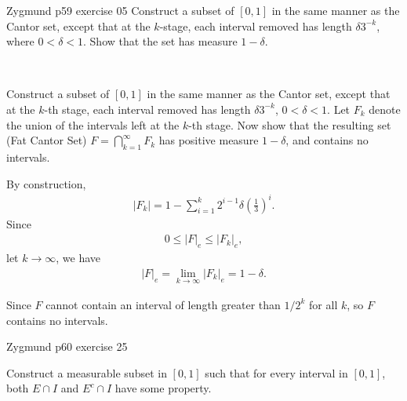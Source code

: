 \documentclass[UTF8,a4paper,10pt]{article}
\begin{document}
  \begin{Problem}[]{Zygmund p59 exercise 05}
    Construct a subset of $[0, 1]$ in the same manner as the Cantor set, except that at the $k$-stage, each interval removed has length $\delta3^{-k}$, where $0 < \delta < 1$. Show that the set has measure $1 - \delta$.


 
  \end{Problem}

  
\begin{solution}\,

  Construct a subset of \([0, 1]\) in the same manner as the Cantor set, except that at the \(k\)-th stage, each interval removed has length \(\delta 3^{-k}\), \(0 < \delta < 1\). Let \(F_k\) denote the union of the intervals left at the \(k\)-th stage.
  Now show that the resulting set (Fat Cantor Set) \(F = \bigcap_{k=1}^{\infty} F_k \) has positive measure \(1 - \delta\), and contains no intervals.
  
  By construction,
  \begin{equation*}
    \begin{aligned}
      |F_k| = 1 - \sum_{i=1}^{k} 2^{i-1}\delta(\frac{1}{3})^i.
    \end{aligned}
  \end{equation*}
  Since
  \begin{equation*}
    \begin{aligned}
      0\leq|F|_e\leq|F_k|_e,
    \end{aligned}
  \end{equation*}
  let \(k\to \infty\), we have 
  \begin{equation*}
    \begin{aligned}
      |F|_e = \lim_{k \to \infty}|F_k|_e = 1-\delta  .
    \end{aligned}
  \end{equation*}
  
  Since \(F\) cannot contain an interval of length greater than \(1/2^k\) for all \(k\), so \(F\) contains no intervals. 
  


\end{solution}

  
\begin{Problem}[]{Zygmund p60 exercise 25}

  Construct a measurable subset in $[0, 1]$ such that for every interval in $[0, 1]$, both $E \cap I$ and $E^c \cap I$ have some property. 
\end{Problem}
\end{document}
